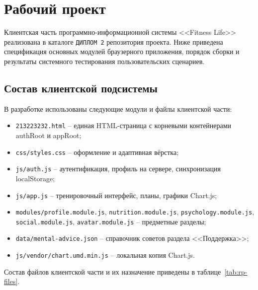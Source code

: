 \section{Рабочий проект}

Клиентская часть программно-информационной системы <<Fitness Life>> реализована в каталоге \texttt{ДИПЛОМ 2} репозитория проекта. Ниже приведена спецификация основных модулей браузерного приложения, порядок сборки и результаты системного тестирования пользовательских сценариев.

\subsection{Состав клиентской подсистемы}

В разработке использованы следующие модули и файлы клиентской части:
\begin{itemize}
	\item \texttt{213223232.html} -- единая HTML-страница с корневыми контейнерами authRoot и appRoot;
	\item \texttt{css/styles.css} -- оформление и адаптивная вёрстка;
	\item \texttt{js/auth.js} -- аутентификация, профиль на сервере, синхронизация localStorage;
	\item \texttt{js/app.js} -- тренировочный интерфейс, планы, графики Chart.js;
	\item \texttt{modules/profile.module.js}, \texttt{nutrition.module.js}, \texttt{psychology.module.js}, \texttt{social.module.js}, \texttt{avatar.module.js} -- предметные разделы;
	\item \texttt{data/mental-advice.json} -- справочник советов раздела <<Поддержка>>;
	\item \texttt{js/vendor/chart.umd.min.js} -- локальная копия Chart.js.
\end{itemize}

Состав файлов клиентской части и их назначение приведены в таблице~\ref{tab:rp-files}.

